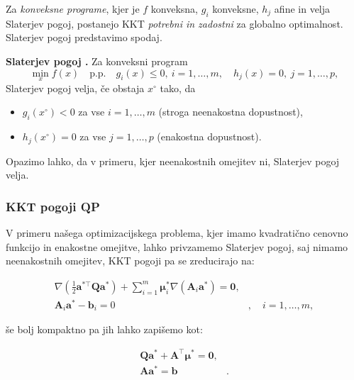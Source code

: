 \documentclass[isrm2, tisk]{fmfdelo}
\newcommand{\muvec}{\boldsymbol{\mu}}
\begin{document}
Za \emph{konveksne programe}, kjer je $f$ konveksna, $g_i$ konveksne, $h_j$ afine in velja Slaterjev pogoj, postanejo \ac{KKT} \emph{potrebni in zadostni} za globalno optimalnost. Slaterjev pogoj predstavimo spodaj.

\textbf{Slaterjev pogoj \cite{bertsekas2016nonlinear,boyd2004convex}.} 
Za konveksni program
\[
\min_x f(x) \quad \text{p.p.} \quad g_i(x) \leq 0, \ i=1,\dots,m, \quad h_j(x) = 0, \ j=1,\dots,p,
\]
Slaterjev pogoj velja, če obstaja $x^\circ$ tako, da
\begin{itemize}
\item $g_i(x^\circ) < 0$ za vse $i=1,\dots,m$ (stroga neenakostna dopustnost),
\item $h_j(x^\circ) = 0$ za vse $j=1,\dots,p$ (enakostna dopustnost).
\end{itemize}

Opazimo lahko, da v primeru, kjer neenakostnih omejitev ni, Slaterjev pogoj velja.

\subsubsection{\acs{KKT} pogoji \acs{QP}}

V primeru našega optimizacijskega problema, kjer imamo kvadratično cenovno funkcijo in enakostne omejitve, lahko privzamemo Slaterjev pogoj, saj nimamo neenakostnih omejitev, \ac{KKT} pogoji pa se zreducirajo na:

\begin{equation}
    \begin{aligned}
        \nabla (\frac{1}{2}\mathbf{a^{*\top}}\mathbf{Q}\mathbf{a^*}) + \sum_{i=1}^m \muvec^*_i \nabla(\mathbf{A}_i \mathbf{a^*}) = \mathbf{0},& \\
        \mathbf{A}_i \mathbf{a^*} - \mathbf{b}_i = 0&, \quad i = 1,\ldots, m,
    \end{aligned}
\end{equation}

\noindent še bolj kompaktno pa jih lahko zapišemo kot:

\begin{equation}
    \begin{aligned}
        \mathbf{Q}\mathbf{a^*} + \mathbf{A^\top}\muvec^* = \mathbf{0},& \\
        \mathbf{A} \mathbf{a^*} = \mathbf{b}&.
    \end{aligned}
\end{equation}
\end{document}
